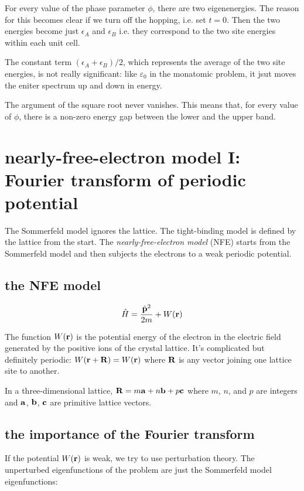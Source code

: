 \documentclass[10pt, a4paper, twocolumn]{article}
\newcommand{\eps}{\ensuremath{\varepsilon _0}}
\begin{document}
For every value of the phase parameter $\phi$, there are two eigenenergies. The reason for this becomes clear if we turn off the hopping, i.e. set $t=0$. Then the two energies become just $\epsilon _A$ and $\epsilon _B$ i.e. they correspond to the two site energies within each unit cell.

The constant term $(\epsilon _A+\epsilon _B)/2$, which represents the average of the two site energies, is not really significant: like $\eps$ in the monatomic problem, it jsut moves the eniter spectrum up and down in energy.

The argument of the square root never vanishes. This means that, for every value of $\phi$, there is a non-zero energy gap between the lower and the upper band.

\section{nearly-free-electron model I: Fourier transform of periodic potential}

The Sommerfeld model ignores the lattice. The tight-binding model is defined by the lattice from the start. The \emph{nearly-free-electron model} (NFE) starts from the Sommerfeld model and then subjects the electrons to a weak periodic potential.

\subsection{the NFE model}

\[\hat H = \frac{\hat{\vb p}^2}{2m} + W(\vb r) \]

The function $W(\vb r)$ is the potential energy of the electron in the electric field generated by the positive ions of the crystal lattice. It's complicated but definitely periodic: $W(\vb r + \vb R) = W(\vb r)$ where $\vb R$ is any vector joining one lattice site to another.

In a three-dimensional lattice, $\vb R = m\vb a+n\vb b + p\vb c$ where $m$, $n$, and $p$ are integers and $\vb a$, $\vb b$, $\vb c$ are primitive lattice vectors.

\subsection{the importance of the Fourier transform}

If the potential $W(\vb r)$ is weak, we try to use perturbation theory. The unperturbed eigenfunctions of the problem are just the Sommerfeld model eigenfunctions:
\end{document}
